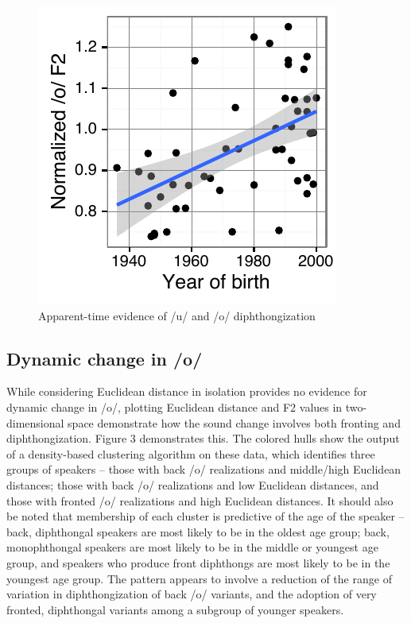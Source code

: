 \documentclass[PWPL]{article}
\begin{document}
\begin{figure}[H]
\includegraphics[scale=0.7]{ow_yob_small.pdf}
\caption{Apparent-time evidence of /u/ and /o/ diphthongization}
\end{figure}
\subsection{Dynamic change in /o/}

While considering Euclidean distance in isolation provides no evidence for dynamic change in /o/, plotting Euclidean distance and F2 values in two-dimensional space demonstrate how the sound change involves both fronting and diphthongization. Figure 3 demonstrates this.  The colored hulls show the output of a density-based clustering algorithm on these data, which identifies three groups of speakers -- those with back /o/ realizations and middle/high Euclidean distances; those with back /o/ realizations and low Euclidean distances, and those with fronted /o/ realizations and high Euclidean distances. It should also be noted that membership of each cluster is predictive of the age of the speaker --  back, diphthongal speakers are most likely to be in the oldest age group; back, monophthongal speakers are most likely to be in the middle or youngest age group, and speakers who produce front diphthongs are most likely to be in the youngest age group. The pattern appears to involve a reduction of the range of variation in diphthongization of back /o/ variants, and the adoption of very fronted, diphthongal variants among a subgroup of younger speakers. 
\end{document}
